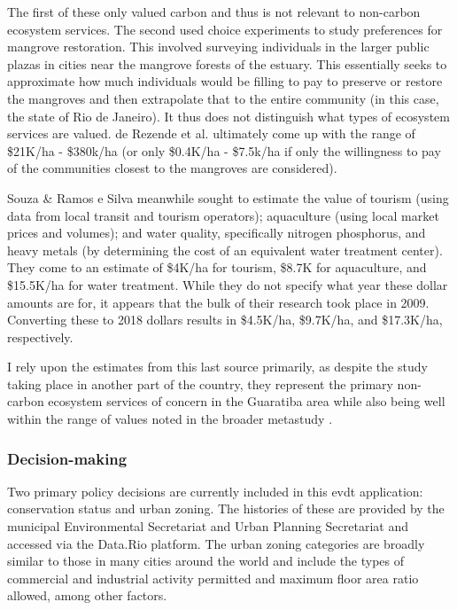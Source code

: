 The first of these only valued carbon and thus is not relevant to non-carbon ecosystem services.  The second used choice experiments to study preferences for mangrove restoration. This involved surveying individuals in the larger public plazas in cities near the mangrove forests of the estuary. This essentially seeks to approximate how much individuals would be filling to pay to preserve or restore the mangroves and then extrapolate that to the entire community (in this case, the state of Rio de Janeiro). It thus does not distinguish what types of ecosystem services are valued. de Rezende et al. ultimately come up with the range of \$21K/ha - \$380k/ha (or only \$0.4K/ha - \$7.5k/ha if only the willingness to pay of the communities closest to the mangroves are considered).

Souza \& Ramos e Silva meanwhile sought to estimate the value of tourism (using data from local transit and tourism operators); aquaculture (using local market prices and volumes); and water quality, specifically nitrogen phosphorus, and heavy metals (by determining the cost of an equivalent water treatment center). They come to an estimate of \$4K/ha for tourism, \$8.7K for aquaculture, and \$15.5K/ha for water treatment. While they do not specify what year these dollar amounts are for, it appears that the bulk of their research took place in 2009. Converting these to 2018 dollars results in \$4.5K/ha, \$9.7K/ha, and \$17.3K/ha, respectively.

I rely upon the estimates from this last source primarily, as despite the study taking place in another part of the country, they represent the primary non-carbon ecosystem services of concern in the Guaratiba area while also being well within the range of values noted in the broader metastudy \cite{jungGapsMangroveForestInReview}. 

\subsubsection{Decision-making}

Two primary policy decisions are currently included in this \ac{evdt} application: conservation status and urban zoning. The histories of these are provided by the municipal Environmental Secretariat and Urban Planning Secretariat and accessed via the Data.Rio platform. The urban zoning categories are broadly similar to those in many cities around the world and include the types of commercial and industrial activity permitted and maximum floor area ratio allowed, among other factors. 

